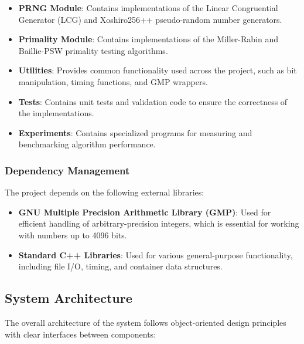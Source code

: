 \begin{itemize}
    \item \textbf{PRNG Module}: Contains implementations of the Linear Congruential Generator (LCG) and Xoshiro256++ pseudo-random number generators.
    
    \item \textbf{Primality Module}: Contains implementations of the Miller-Rabin and Baillie-PSW primality testing algorithms.
    
    \item \textbf{Utilities}: Provides common functionality used across the project, such as bit manipulation, timing functions, and GMP wrappers.
    
    \item \textbf{Tests}: Contains unit tests and validation code to ensure the correctness of the implementations.
    
    \item \textbf{Experiments}: Contains specialized programs for measuring and benchmarking algorithm performance.
\end{itemize}

\subsubsection{Dependency Management}

The project depends on the following external libraries:

\begin{itemize}
    \item \textbf{GNU Multiple Precision Arithmetic Library (GMP)}: Used for efficient handling of arbitrary-precision integers, which is essential for working with numbers up to 4096 bits.
    
    \item \textbf{Standard C++ Libraries}: Used for various general-purpose functionality, including file I/O, timing, and container data structures.
\end{itemize}

\subsection{System Architecture}

The overall architecture of the system follows object-oriented design principles with clear interfaces between components:

